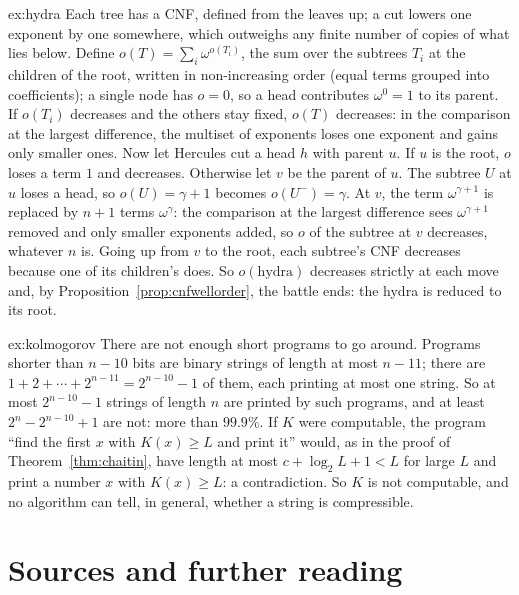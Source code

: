 \begin{solution}{ex:hydra}
\idea Each tree has a CNF, defined from the leaves up; a cut lowers one exponent by one somewhere, which outweighs any finite number of copies of what lies below.
\writeup Define $o(T)=\sum_i\omega^{o(T_i)}$, the sum over the subtrees $T_i$ at the children of the root, written in non-increasing order (equal terms grouped into coefficients); a single node has $o=0$, so a head contributes $\omega^0=1$ to its parent. If $o(T_i)$ decreases and the others stay fixed, $o(T)$ decreases: in the comparison at the largest difference, the multiset of exponents loses one exponent and gains only smaller ones. Now let Hercules cut a head $h$ with parent $u$. If $u$ is the root, $o$ loses a term $1$ and decreases. Otherwise let $v$ be the parent of $u$. The subtree $U$ at $u$ loses a head, so $o(U)=\gamma+1$ becomes $o(U^-)=\gamma$. At $v$, the term $\omega^{\gamma+1}$ is replaced by $n+1$ terms $\omega^{\gamma}$: the comparison at the largest difference sees $\omega^{\gamma+1}$ removed and only smaller exponents added, so $o$ of the subtree at $v$ decreases, whatever $n$ is. Going up from $v$ to the root, each subtree's CNF decreases because one of its children's does. So $o(\text{hydra})$ decreases strictly at each move and, by Proposition~\ref{prop:cnfwellorder}, the battle ends: the hydra is reduced to its root.
\end{solution}

\begin{solution}{ex:kolmogorov}
\idea There are not enough short programs to go around.
\writeup Programs shorter than $n-10$ bits are binary strings of length at most $n-11$; there are $1+2+\cdots+2^{n-11}=2^{n-10}-1$ of them, each printing at most one string. So at most $2^{n-10}-1$ strings of length $n$ are printed by such programs, and at least $2^n-2^{n-10}+1$ are not: more than $99.9\%$. If $K$ were computable, the program ``find the first $x$ with $K(x)\ge L$ and print it'' would, as in the proof of Theorem~\ref{thm:chaitin}, have length at most $c+\log_2L+1<L$ for large $L$ and print a number $x$ with $K(x)\ge L$: a contradiction. So $K$ is not computable, and no algorithm can tell, in general, whether a string is compressible.
\end{solution}

\section*{Sources and further reading}

